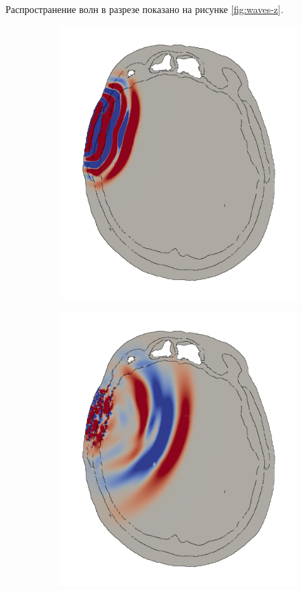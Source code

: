 Распространение волн в разрезе показано на рисунке \ref{fig:waves-z}.
\begin{figure}[H]
\centering
\begin{subfigure}{.3\textwidth}
  \centering
  \includegraphics[width=1.0\linewidth]{pictures/skull/elastic-pressure-z-with-bounds/six/1.png}
\end{subfigure}
\begin{subfigure}{.3\textwidth}
  \centering
  \includegraphics[width=1.0\linewidth]{pictures/skull/elastic-pressure-z-with-bounds/six/2.png}

\end{subfigure}
\end{figure}
